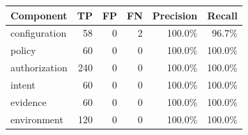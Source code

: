 \begin{tabular}{@{}lrrrrr@{}}
\toprule
Component & TP & FP & FN & Precision & Recall \\
\midrule
configuration & 58 & 0 & 2 & 100.0\% & 96.7\% \\
policy & 60 & 0 & 0 & 100.0\% & 100.0\% \\
authorization & 240 & 0 & 0 & 100.0\% & 100.0\% \\
intent & 60 & 0 & 0 & 100.0\% & 100.0\% \\
evidence & 60 & 0 & 0 & 100.0\% & 100.0\% \\
environment & 120 & 0 & 0 & 100.0\% & 100.0\% \\
\bottomrule
\end{tabular}
